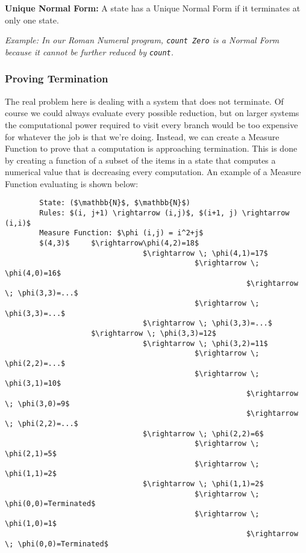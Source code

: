 \documentclass{article}
\begin{document}
        \medskip\noindent
        \textbf{Unique Normal Form:} A state has a Unique Normal Form if it terminates at only one state. 
        
        \textit{Example: In our Roman Numeral program, \lstinline{count Zero} is a Normal Form because it cannot be further reduced by \lstinline{count}.}
        
        \subsubsection{Proving Termination}
        The real problem here is dealing with a system that does not terminate. Of course we could always evaluate every possible reduction, but on larger systems the computational power required to visit every branch would be too expensive for whatever the job is that we're doing. Instead, we can create a Measure Function to prove that a computation is approaching termination. This is done by creating a function of a subset of the items in a state that computes a numerical value that is decreasing every computation. An example of a Measure Function evaluating is shown below:
        
        \begin{lstlisting}
        State: ($\mathbb{N}$, $\mathbb{N}$)
        Rules: $(i, j+1) \rightarrow (i,j)$, $(i+1, j) \rightarrow (i,i)$
        Measure Function: $\phi (i,j) = i^2+j$
        $(4,3)$     $\rightarrow\phi(4,2)=18$
                                $\rightarrow \; \phi(4,1)=17$   
                                            $\rightarrow \; \phi(4,0)=16$
                                                        $\rightarrow \; \phi(3,3)=...$
                                            $\rightarrow \; \phi(3,3)=...$
                                $\rightarrow \; \phi(3,3)=...$
                    $\rightarrow \; \phi(3,3)=12$
                                $\rightarrow \; \phi(3,2)=11$
                                            $\rightarrow \; \phi(2,2)=...$
                                            $\rightarrow \; \phi(3,1)=10$
                                                        $\rightarrow \; \phi(3,0)=9$
                                                        $\rightarrow \; \phi(2,2)=...$
                                $\rightarrow \; \phi(2,2)=6$
                                            $\rightarrow \; \phi(2,1)=5$
                                            $\rightarrow \; \phi(1,1)=2$
                                $\rightarrow \; \phi(1,1)=2$
                                            $\rightarrow \; \phi(0,0)=Terminated$
                                            $\rightarrow \; \phi(1,0)=1$
                                                        $\rightarrow \; \phi(0,0)=Terminated$
        
        \end{lstlisting}
        
\end{document}
